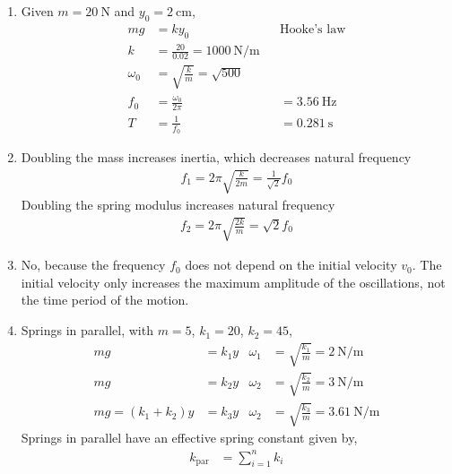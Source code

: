 \begin{enumerate}
    \item Given $ m = \SI{20}{\newton} $ and $ y_{0} = \SI{2}{\cm} $,
          \begin{align}
              mg         & = ky_{0}                                &  & \text{Hooke's law} \\
              k          & = \frac{20}{0.02} = \SI{1000}{\N\per\m}                         \\
              \omega_{0} & = \sqrt{\frac{k}{m}} = \sqrt{500}                               \\
              f_{0}      & = \frac{\omega_{0}}{2\pi}               &  & = \SI{3.56}{\Hz}   \\
              T          & = \frac{1}{f_{0}}                       &  & = \SI{0.281}{\s}
          \end{align}

    \item Doubling the mass increases inertia, which decreases natural frequency
          \begin{align}
              f_{1} = 2\pi \sqrt{\frac{k}{2m}} = \frac{1}{\sqrt{2}}f_{0}
          \end{align}
          Doubling the spring modulus increases natural frequency
          \begin{align}
              f_{2} = 2\pi \sqrt{\frac{2k}{m}} = \sqrt{2}f_{0}
          \end{align}

    \item No, because the frequency $ f_{0} $ does not depend on the initial velocity $ v_{0} $.
          The initial velocity only increases the maximum amplitude of the oscillations, not the time
          period of the motion.

    \item Springs in parallel, with $ m = 5 $, $ k_{1} = 20 $, $ k_{2} = 45$,
          \begin{align}
              mg                    & = k_{1}y & \omega_{1} & = \sqrt{\frac{k_{1}}{m}} = \SI{2}{\N\per\m}    \\
              mg                    & = k_{2}y & \omega_{2} & = \sqrt{\frac{k_{2}}{m}} = \SI{3}{\N\per\m}    \\
              mg = (k_{1} + k_{2})y & = k_{3}y & \omega_{2} & = \sqrt{\frac{k_{3}}{m}} = \SI{3.61}{\N\per\m}
          \end{align}
          Springs in parallel have an effective spring constant given by,
          \begin{align}
              k_{\text{par}} & = \sum_{i=1}^{n}k_{i}
          \end{align}


\end{enumerate}
